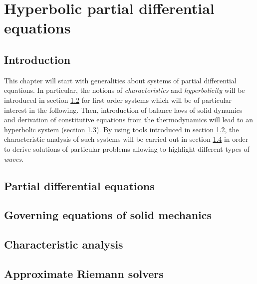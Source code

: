 \chapter{Hyperbolic partial differential equations}
\newpage
\section{Introduction}
This chapter will start with generalities about systems of partial differential equations. In particular, the notions of \textit{characteristics} and \textit{hyperbolicity} will be introduced in section \ref{sec:PDEs} for first order systems which will be of particular interest in the following.
Then, introduction of balance laws of solid dynamics and derivation of constitutive equations from the thermodynamics will lead to an hyperbolic system (section \ref{sec:solidMech_equations}). By using tools introduced in section \ref{sec:PDEs}, the characteristic analysis of such systems will be carried out in section \ref{sec:characteristic_analysis} in order to derive solutions of particular problems allowing to highlight different types of \textit{waves}.

\section{Partial differential equations}
\label{sec:PDEs}


\section{Governing equations of solid mechanics}
\label{sec:solidMech_equations}



\section{Characteristic analysis}
\label{sec:characteristic_analysis}



\section{Approximate Riemann solvers}
\label{sec:riemann_solvers}





